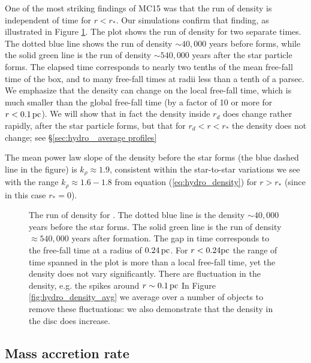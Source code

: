 \documentclass[../dissertation.tex]{subfiles}
\begin{document}
One of the most striking findings of MC15 was that the run of density is 
independent of time for $r<r_*$. 
Our simulations confirm that finding, 
as illustrated in Figure \ref{fig:hydro_quad2_run_of_density_double}.
The plot shows the run of density for two separate times.
The dotted blue line shows the run of density $\sim 40,000$ years 
before \partA forms, while the solid green line is the run of 
density $\sim 540,000$ years after the star particle forms.
The elapsed time corresponds to nearly two tenths of the mean free-fall 
time of the box, and to many free-fall times at radii less than a tenth of a parsec.
We emphasize that the density can change on the local free-fall time, which is much smaller than the global free-fall time (by a factor of 10 or more for $r<0.1\,\rm pc$). We will show that in fact the density inside $r_d$ does change rather rapidly, after the star particle forms, but that for $r_d<r<r_*$ the density does not change; see \S \ref{sec:hydro_ average profiles}

The mean power law slope of the density before the star forms (the blue dashed line in the figure) is $k_\rho \approx 1.9$, consistent within the star-to-star variations we see  with the range $k_\rho \approx 1.6 - 1.8$ from equation (\ref{eq:hydro_density}) for $r>r_*$ (since in this case $r_*=0$).

%
\begin{figure}[htb] %
\caption[Hydro Run of Density]{\label{fig:hydro_quad2_run_of_density_double}The run of density for \partA. The dotted blue line is the 
density $\sim 40,000$ years before the star forms.
The solid green line is the run of density $\approx 540,000$ years after formation. 
The gap in time corresponds to the free-fall time at a radius of $0.24\,\rm pc$.
For $r < 0.24 {\rm pc}$ the range of time spanned in the plot is more than a local free-fall time, yet the density does not vary significantly.
There are fluctuation in the density, e.g. the spikes around $r \sim 0.1\,\rm pc$
In Figure \ref{fig:hydro_density_avg} we average over a number of objects to remove these fluctuations: we also demonstrate that the density in the disc does increase.}

\end{figure}
%
\subsection{Mass accretion rate}\label{sec:hydro_Mass_accretion}
\end{document}
